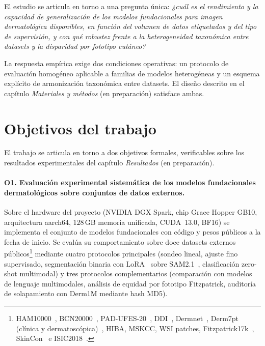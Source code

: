 El estudio se articula en torno a una pregunta única: \emph{¿cuál
es el rendimiento y la capacidad de generalización de los modelos
fundacionales para imagen dermatológica disponibles, en función del
volumen de datos etiquetados y del tipo de supervisión, y con qué
robustez frente a la heterogeneidad taxonómica entre datasets y la
disparidad por fototipo cutáneo?}

La respuesta empírica exige dos condiciones operativas: un
protocolo de evaluación homogéneo aplicable a familias de modelos
heterogéneas y un esquema explícito de armonización taxonómica
entre datasets. El diseño descrito en el
capítulo \emph{Materiales y métodos} (en preparación) satisface ambas.

\section{Objetivos del trabajo}
\label{sec:objetivos}

El trabajo se articula en torno a dos objetivos formales,
verificables sobre los resultados experimentales del
capítulo \emph{Resultados} (en preparación).

\paragraph{O1. Evaluación experimental sistemática de los modelos
fundacionales dermatológicos sobre conjuntos de datos externos.}
Sobre el hardware del proyecto (NVIDIA DGX Spark, chip Grace Hopper
GB10, arquitectura aarch64, $128$\,GB memoria unificada,
CUDA~13.0, BF16) se implementa el conjunto de modelos fundacionales
con código y pesos públicos a la fecha de inicio. Se evalúa su
comportamiento sobre doce datasets externos
públicos\footnote{HAM10000~\cite{ham10000},
BCN20000~\cite{bcn20000}, PAD-UFES-20~\cite{padufes},
DDI~\cite{ddi}, Dermnet~\cite{dermnet}, Derm7pt
(clínica y dermatoscópica)~\cite{kawahara2019}, HIBA, MSKCC, WSI
patches, Fitzpatrick17k~\cite{fitzpatrick17k},
SkinCon~\cite{skincon} e ISIC2018~\cite{isic2018}.} mediante cuatro
protocolos principales (sondeo lineal, ajuste fino supervisado,
segmentación binaria con LoRA~\cite{lora} sobre SAM2.1~\cite{sam2},
clasificación zero-shot multimodal) y tres protocolos
complementarios (comparación con modelos de lenguaje multimodales,
análisis de equidad por fototipo Fitzpatrick, auditoría de
solapamiento con Derm1M mediante hash MD5).

